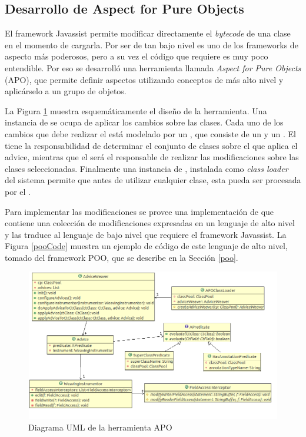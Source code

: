 	\subsection{Desarrollo de Aspect for Pure Objects}
		El framework Javassist permite modificar directamente el \emph{bytecode} de
		una clase en el momento de cargarla.
		Por ser de tan bajo nivel es uno de los frameworks de aspecto más poderosos,
		pero a su vez el código que requiere es muy poco entendible.
		Por eso se desarrolló una herramienta llamada \emph{Aspect for Pure Objects} (APO), 
		que permite definir aspectos utilizando conceptos de más alto nivel y
		aplicárselo a un grupo de objetos. 
		
		La Figura \ref{aopImage} muestra esquemáticamente el diseño de la herramienta.
		Una instancia de  se ocupa de aplicar los cambios sobre las
		clases.
		Cada uno de los cambios que debe realizar el  está
		modelado por un , que consiste de un  y un
		.
		El  tiene la responsabilidad de determinar el conjunto de
		clases sobre el que aplica el advice, mientras que el
		 será el responsable de realizar las modificaciones
		sobre las clases seleccionadas.
		Finalmente una instancia de , instalada como \emph{class
		loader} del sistema permite que antes de utilizar cualquier clase, esta pueda
		ser procesada por el .
		
		Para implementar las modificaciones se provee una implementación de
		 que contiene una colección de modificaciones expresadas en un
		lenguaje de alto nivel y las traduce al lenguaje de bajo nivel que requiere el
		framework Javassist.
		La Figura \ref{pooCode} muestra un ejemplo de código de este lenguaje de alto nivel,
		tomado del framework POO, que se describe en la Sección \ref{poo}.
		
		\begin{figure}[h]
			\centering
			\includegraphics[width=450px, height=250px]{img/aop}
			\caption{Diagrama UML de la herramienta APO}
			\label{aopImage}
		\end{figure}	 
		
